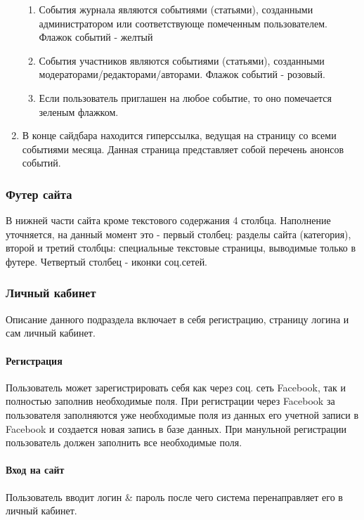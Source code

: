 \documentclass[12pt]{article} %
\begin{document}
\begin{enumerate}
        \begin{enumerate}
            \item События журнала являются событиями (статьями), созданными администратором или соответствующе помеченным пользователем. Флажок событий - желтый
            \item События участников являются событиями (статьями), созданными модераторами/редакторами/авторами. Флажок событий - розовый.
            \item Если пользователь приглашен на любое событие, то оно помечается зеленым флажком.
        \end{enumerate}
    \item В конце сайдбара находится гиперссылка, ведущая на страницу со всеми событиями месяца. Данная страница представляет собой перечень анонсов событий.
\end{enumerate}

\subsubsection{Футер сайта}
В нижней части сайта кроме текстового содержания 4 столбца. Наполнение уточняется, на данный момент это - первый столбец: разделы сайта (категория), второй и третий столбцы: специальные текстовые страницы, выводимые только в футере. Четвертый столбец - иконки соц.сетей.

\subsubsection{Личный кабинет}
Описание данного подраздела включает в себя регистрацию, страницу логина и сам личный кабинет.

\paragraph{Регистрация}
Пользователь может зарегистрировать себя как через соц. сеть Facebook, так и полностью заполнив необходимые поля. 
При регистрации через Facebook за пользователя заполняются уже необходимые поля из данных его учетной записи в Facebook и создается новая запись в базе данных. При манульной регистрации пользователь должен заполнить все  необходимые поля.

\paragraph{Вход на сайт}
Пользователь вводит логин \& пароль после чего система перенаправляет его в личный кабинет.
\end{document}
